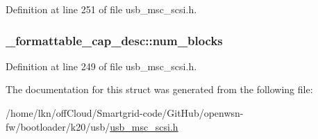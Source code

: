 Definition at line 251 of file usb\+\_\+msc\+\_\+scsi.\+h.

\subsubsection[{\texorpdfstring{num\+\_\+blocks}{num_blocks}}]{ \+\_\+formattable\+\_\+cap\+\_\+desc\+::num\+\_\+blocks}\hypertarget{struct__formattable__cap__desc_acd5b9eff05c2086f26b00499a758b0d3}{}\label{struct__formattable__cap__desc_acd5b9eff05c2086f26b00499a758b0d3}


Definition at line 249 of file usb\+\_\+msc\+\_\+scsi.\+h.



The documentation for this struct was generated from the following file\+:\begin{DoxyCompactItemize}
\item 
/home/lkn/off\+Cloud/\+Smartgrid-\/code/\+Git\+Hub/openwsn-\/fw/bootloader/k20/usb/\hyperlink{usb__msc__scsi_8h}{usb\+\_\+msc\+\_\+scsi.\+h}\end{DoxyCompactItemize}

